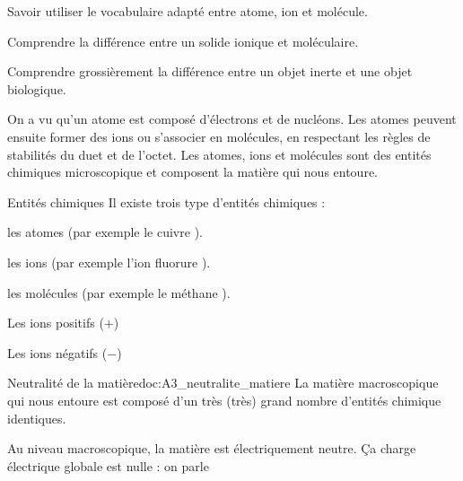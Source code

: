 \teteSndMole

\vspace*{-32pt}


\begin{objectifs}
  \item Savoir utiliser le vocabulaire adapté entre atome, ion et molécule.
  \item Comprendre la différence entre un solide ionique et moléculaire.
  \item Comprendre grossièrement la différence entre un objet inerte et une objet biologique.
\end{objectifs}

\begin{contexte}
  On a vu qu'un atome est composé d'électrons et de nucléons.
  Les atomes peuvent ensuite former des ions ou s'associer en molécules, en respectant les règles de stabilités du duet et de l'octet.
  Les atomes, ions et molécules sont des entités chimiques microscopique et composent la matière qui nous entoure.

  
  
\end{contexte}



\begin{doc}{Entités chimiques}
  Il existe trois type d'entités chimiques :
  \begin{listePoints}
    \item les atomes (par exemple le cuivre ).
    \item les ions (par exemple l'ion fluorure ).
    \item les molécules (par exemple le méthane ).
  \end{listePoints}
  
  \begin{encart}
    Les ions positifs ($+$) 
    
    Les ions négatifs ($-$) 
  \end{encart}
\end{doc}

\begin{doc}{Neutralité de la matière}{doc:A3_neutralite_matiere}
  La matière macroscopique qui nous entoure est composé d'un très (très) grand nombre d'entités chimique identiques.
  
  \begin{encart}
    Au niveau macroscopique, la matière est électriquement neutre.
    Ça charge électrique globale est nulle : on parle 
  \end{encart}
\end{doc}

